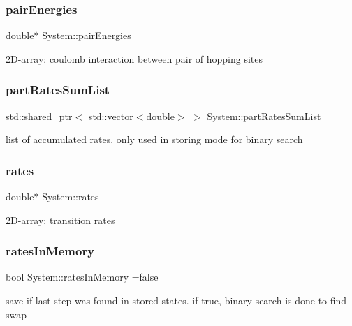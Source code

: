 \subsubsection{\texorpdfstring{pair\+Energies}{pairEnergies}}
{\footnotesize\ttfamily double$\ast$ System\+::pair\+Energies\hspace{0.3cm}{\ttfamily [private]}}

2\+D-\/array\+: coulomb interaction between pair of hopping sites \mbox{\label{classSystem_ae1d936be9d2c423ef42a2c16dc269e6c}} 
\subsubsection{\texorpdfstring{part\+Rates\+Sum\+List}{partRatesSumList}}
{\footnotesize\ttfamily std\+::shared\+\_\+ptr$<$ std\+::vector$<$double$>$ $>$ System\+::part\+Rates\+Sum\+List\hspace{0.3cm}{\ttfamily [private]}}

list of accumulated rates. only used in storing mode for binary search \mbox{\label{classSystem_ad89fb08497a4d886f64a91a7d302b296}} 
\subsubsection{\texorpdfstring{rates}{rates}}
{\footnotesize\ttfamily double$\ast$ System\+::rates\hspace{0.3cm}{\ttfamily [private]}}

2\+D-\/array\+: transition rates \mbox{\label{classSystem_abdb9c2321ac8dbfc6a5febc07ae4def9}} 
\subsubsection{\texorpdfstring{rates\+In\+Memory}{ratesInMemory}}
{\footnotesize\ttfamily bool System\+::rates\+In\+Memory =false\hspace{0.3cm}{\ttfamily [private]}}

save if last step was found in stored states. if true, binary search is done to find swap \mbox{\label{classSystem_a0d59e20f6ebffb9b2b6e31f7e85d1756}} 
